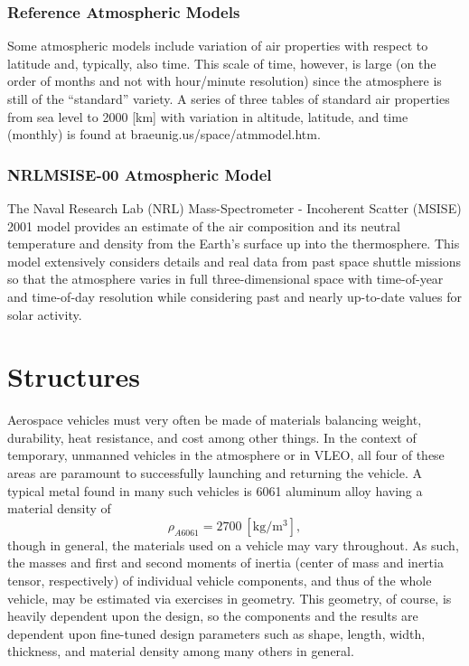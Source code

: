 \documentclass[11pt,dvipsnames]{thesis}
\begin{document}
\subsection{Reference Atmospheric Models}
Some atmospheric models include variation of air properties with respect to latitude and, typically, also time. This scale of time, however, is large (on the order of months and not with hour/minute resolution) since the atmosphere is still of the ``standard'' variety. A series of three tables of standard air properties from sea level to 2000 [\si{\km}] with variation in altitude, latitude, and time (monthly) is found at braeunig.us/space/atmmodel.htm. 

\subsection{NRLMSISE-00 Atmospheric Model}
The Naval Research Lab (NRL) Mass-Spectrometer - Incoherent Scatter (MSISE) 2001 model provides an estimate of the air composition and its neutral temperature and density from the Earth's surface up into the thermosphere. This model extensively considers details and real data from past space shuttle missions so that the atmosphere varies in full three-dimensional space with time-of-year and time-of-day resolution while considering past and nearly up-to-date values for solar activity.


\chapter{Structures} \label{ch:Structures}

Aerospace vehicles must very often be made of materials balancing weight, durability, heat resistance, and cost among other things. In the context of temporary, unmanned vehicles in the atmosphere or in VLEO, all four of these areas are paramount to successfully launching and returning the vehicle. A typical metal found in many such vehicles is 6061 aluminum alloy having a material density of
\begin{equation}
\rho_{A6061} = 2700 \ [\si{\kg/\m\cubed}],
\end{equation}
though in general, the materials used on a vehicle may vary throughout. As such, the masses and first and second moments of inertia (center of mass and inertia tensor, respectively) of individual vehicle components, and thus of the whole vehicle, may be estimated via exercises in geometry. This geometry, of course, is heavily dependent upon the design, so the components and the results are dependent upon fine-tuned design parameters such as shape, length, width, thickness, and material density among many others in general.
\end{document}
